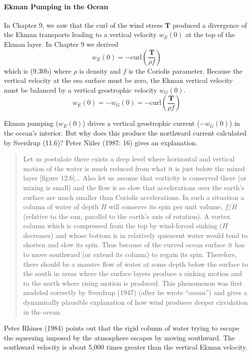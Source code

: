 \paragraph{Ekman Pumping in the Ocean}
In Chapter 9, we saw that the curl of the wind
stress $\mathbf{T}$ produced a divergence
of the Ekman transports leading to a vertical
velocity $w_E (0)$ at the top of the Ekman layer. In Chapter 9 we
derived
\begin{equation}
w_E (0) = -\text{curl}\left(\frac{\mathbf{T}}{\rho f} \right)
\end{equation}
which is (9.30b) where $\rho$ is density and $f$ is the Coriolis
parameter. Because the vertical velocity at
the sea surface must be zero, the Ekman vertical velocity must be
balanced by a vertical geostrophic velocity $w_G(0)$.
\begin{equation}
w_E (0) = - w_G (0) = -\text{curl}\left(\frac{\mathbf{T}}{\rho f} \right)
\end{equation}

Ekman pumping ($w_E (0)$) drives a vertical geostrophic current ($-w_G
(0)$) in the ocean's interior. But why does this produce the northward
current calculated by Sverdrup (11.6)? Peter Niiler (1987: 16) gives
an explanation.

\begin{quotation} \small
Let us postulate there exists a deep level where horizontal and
vertical motion of the water is much reduced from what it is just
below the mixed layer [figure
  12.6]$\ldots$ Also let us assume that vorticity is conserved there
(or mixing is small) and the flow is so slow that accelerations over
the earth's surface are much smaller than Coriolis accelerations. In
such a situation a column of water of depth $H$ will conserve its spin
per unit volume, $f/H$ (relative to the sun, parallel to the earth's
axis of rotation).  A vortex column which is compressed from the top
by wind-forced sinking ($H$ decreases) and whose bottom is in
relatively quiescent water would tend to shorten and slow its
spin. Thus because of the curved ocean surface it has to move
southward (or extend its column) to regain its spin. Therefore, there
should be a massive flow of water at some depth below the surface to
the south in areas where the surface layers produce a sinking motion
and to the north where rising motion is produced. This phenomenon was
first modeled correctly by Sverdrup (1947) (after he wrote ``ocean'')
and gives a dynamically plausible explanation of how wind produces
deeper circulation in the ocean.
\end{quotation}
Peter Rhines (1984) points out that the rigid column of water trying
to escape the squeezing imposed by the atmosphere escapes by moving
southward. The southward velocity is about 5,000 times greater than
the vertical Ekman velocity.

